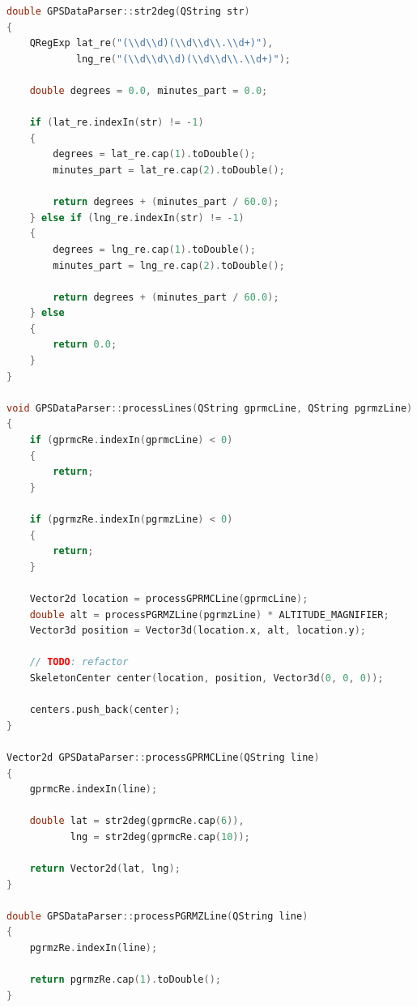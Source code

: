\documentclass[simple,a4paper,14pt,ukrainian,utf8]{eskdtext}
\begin{document}
\begin{small}
\begin{lstlisting}[language=C++]
double GPSDataParser::str2deg(QString str)
{
    QRegExp lat_re("(\\d\\d)(\\d\\d\\.\\d+)"),
            lng_re("(\\d\\d\\d)(\\d\\d\\.\\d+)");

    double degrees = 0.0, minutes_part = 0.0;

    if (lat_re.indexIn(str) != -1)
    {
        degrees = lat_re.cap(1).toDouble();
        minutes_part = lat_re.cap(2).toDouble();

        return degrees + (minutes_part / 60.0);
    } else if (lng_re.indexIn(str) != -1)
    {
        degrees = lng_re.cap(1).toDouble();
        minutes_part = lng_re.cap(2).toDouble();

        return degrees + (minutes_part / 60.0);
    } else
    {
        return 0.0;
    }
}

void GPSDataParser::processLines(QString gprmcLine, QString pgrmzLine)
{
    if (gprmcRe.indexIn(gprmcLine) < 0)
    {
        return;
    }

    if (pgrmzRe.indexIn(pgrmzLine) < 0)
    {
        return;
    }

    Vector2d location = processGPRMCLine(gprmcLine);
    double alt = processPGRMZLine(pgrmzLine) * ALTITUDE_MAGNIFIER;
    Vector3d position = Vector3d(location.x, alt, location.y);

    // TODO: refactor
    SkeletonCenter center(location, position, Vector3d(0, 0, 0));

    centers.push_back(center);
}

Vector2d GPSDataParser::processGPRMCLine(QString line)
{
    gprmcRe.indexIn(line);

    double lat = str2deg(gprmcRe.cap(6)),
           lng = str2deg(gprmcRe.cap(10));

    return Vector2d(lat, lng);
}

double GPSDataParser::processPGRMZLine(QString line)
{
    pgrmzRe.indexIn(line);

    return pgrmzRe.cap(1).toDouble();
}
\end{lstlisting}
\end{small}
\end{document}
